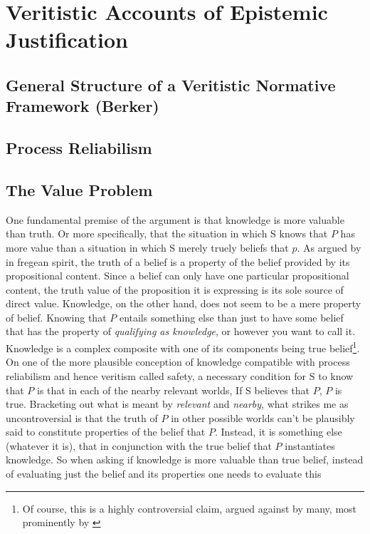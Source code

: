 \documentclass[12pt,numbers=noenddot]{scrartcl}
\begin{document}
\section{Veritistic Accounts of Epistemic Justification}
\subsection{General Structure of a Veritistic Normative Framework (Berker)}
\subsection{Process Reliabilism}

\subsection{The Value Problem}

One fundamental premise of the argument is that knowledge is more valuable than truth. Or more specifically, that the situation in which S knows that $P$ has more value than a situation in which S merely truely beliefs that $p$. As argued by \textcite[35-38]{grundmann2008} in fregean spirit, the truth of a belief is a property of the belief provided by its propositional content. Since a belief can only have one particular propositional content, the truth value of the proposition it is expressing is its sole source of direct value. Knowledge, on the other hand, does not seem to be a mere property of belief. Knowing that $P$ entails something else than just to have some belief that has the property of \emph{qualifying as knowledge}, or however you want to call it. Knowledge is a complex composite with one of its components being true belief\footnote{Of course, this is a highly controversial claim, argued against by many, most prominently by \textcite{Williamson2000-WILKAI}}. On one of the more plausible conception of knowledge compatible with process reliabilism and hence veritism called safety, a necessary condition for S to know that $P$ is that in each of the nearby relevant worlds, If S believes that $P$, $P$ is true. Bracketing out what is meant by \emph{relevant} and \emph{nearby}, what strikes me as uncontroversial is that the truth of $P$ in other possible worlds can't be plausibly said to constitute properties of the belief that $P$. Instead, it is something else (whatever it is), that in conjunction with the true belief that $P$ instantiates knowledge. So when asking if knowledge is more valuable than true belief, instead of evaluating just the belief and its properties one needs to evaluate this
\end{document}
